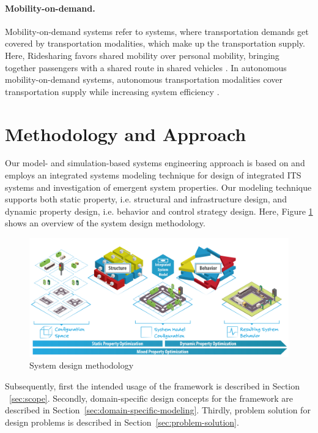 \documentclass[a4paper,twoside]{article}
\begin{document}
	\paragraph{Mobility-on-demand.}
	\label{sec:mobility-on-demand-systems}

	Mobility-on-demand systems refer to systems, where transportation demands get covered by transportation modalities, which make up the transportation supply.
	Here, Ridesharing favors shared mobility over personal mobility, bringing together passengers with a shared route in shared vehicles \cite{furuhata2013ridesharing}.
	In autonomous mobility-on-demand systems, autonomous transportation modalities cover transportation supply while increasing system efficiency \cite{fagnant2014travel}. 
	
	\section{Methodology and Approach}
	\label{sec:approach}
	
	Our model- and simulation-based systems engineering approach is based on \cite{ascher_hackenberg_2015,ascher_hackenberg_2016,ascher_hackenberg_2017,ascher_hackenberg_albayrak_2023,ascher2023discrete} and employs an integrated systems modeling technique for design of integrated ITS systems and investigation of emergent system properties.
	Our modeling technique supports both static property, i.e. structural and infrastructure design, and dynamic property design, i.e. behavior and control strategy design. Here, Figure \ref{fig:concept} shows an overview of the system design methodology.
	
	\begin{figure}[!ht]
		\centering
		\includegraphics[width=0.95\columnwidth]{./graphics/property_optimization.png}
		\caption{System design methodology}
		\label{fig:concept}
	\end{figure}
	
	Subsequently, first the intended usage of the framework is described in Section ~\ref{sec:scope}.
	Secondly, domain-specific design concepts for the framework are described in Section~\ref{sec:domain-specific-modeling}.
	Thirdly, problem solution for design problems is described in Section~\ref{sec:problem-solution}.
	
\end{document}
